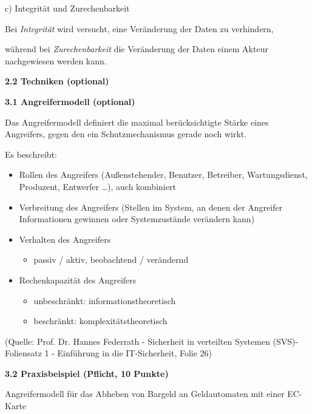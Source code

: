 \documentclass[ngerman]{fbi-aufgabenblatt}
\begin{document}
c) Integrität und Zurechenbarkeit

Bei \emph{Integrität} wird versucht, eine Veränderung der Daten zu verhindern, 

während bei \emph{Zurechenbarkeit} die Veränderung der Daten einem Akteur nachgewiesen werden kann.

\textbf{2.2 Techniken (optional)}


\newpage
{}

\textbf{3.1 Angreifermodell (optional)}

Das Angreifermodell definiert die maximal berücksichtigte Stärke eines
Angreifers, gegen den ein Schutzmechanismus gerade noch wirkt.

Es beschreibt:
\begin{itemize}
\item Rollen des Angreifers (Außenstehender, Benutzer, Betreiber,
Wartungsdienst, Produzent, Entwerfer …), auch kombiniert
\item Verbreitung des Angreifers (Stellen im System, an denen der
Angreifer Informationen gewinnen oder Systemzustände verändern kann)\\
\item Verhalten des Angreifers
	\begin{itemize}
   \item passiv / aktiv, beobachtend / verändernd
   \end{itemize}
\item Rechenkapazität des Angreifers
	\begin{itemize}
   \item unbeschränkt: informationstheoretisch
   \item beschränkt: komplexitätstheoretisch
   \end{itemize}
\end{itemize}

(Quelle: Prof. Dr. Hannes Federrath - Sicherheit in verteilten Systemen (SVS)-Foliensatz 1 - \dq Einführung in die IT-Sicherheit\dq , Folie 26)

\textbf{3.2 Praxisbeispiel (Pflicht, 10 Punkte)}

Angreifermodell für das Abheben von
Bargeld an Geldautomaten mit einer EC-Karte

\end{document}
